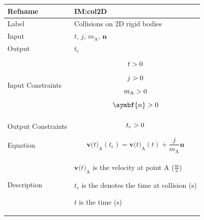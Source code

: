 \documentclass[12pt]{article}
\newcommand{\gt}{\ensuremath >}
\begin{document}
\begin{minipage}{\textwidth}
\begin{tabular}{>{\raggedright}p{}>{\raggedright\arraybackslash}p{}}
\toprule \textbf{Refname} & \textbf{IM:col2D}
\label{IM:col2D}
\\ \midrule
Label & Collisions on 2D rigid bodies
        
\\ \midrule
Input & $t$, $j$, ${m_{\text{A}}}$, $\symbf{n}$
        
\\ \midrule
Output & ${t_{\text{c}}}$
         
\\ \midrule
Input Constraints & \begin{displaymath}
                    t\gt{}0
                    \end{displaymath}
                    \begin{displaymath}
                    j\gt{}0
                    \end{displaymath}
                    \begin{displaymath}
                    {m_{\text{A}}}\gt{}0
                    \end{displaymath}
                    \begin{displaymath}
                    \symbf{n}\gt{}0
                    \end{displaymath}
\\ \midrule
Output Constraints & \begin{displaymath}
                     {t_{\text{c}}}\gt{}0
                     \end{displaymath}
\\ \midrule
Equation & \begin{displaymath}
           {\symbf{v}\text{(}t\text{)}_{\text{A}}}\left({t_{\text{c}}}\right)={\symbf{v}\text{(}t\text{)}_{\text{A}}}\left(t\right)+\frac{j}{{m_{\text{A}}}} \symbf{n}
           \end{displaymath}
\\ \midrule
Description & \begin{symbDescription}
              \item{${\symbf{v}\text{(}t\text{)}_{\text{A}}}$ is the velocity at point A ($\frac{\text{m}}{\text{s}}$)}
              \item{${t_{\text{c}}}$ is the denotes the time at collision (${\text{s}}$)}
              \item{$t$ is the time (${\text{s}}$)}

\end{symbDescription}
\end{tabular}
\end{minipage}
\end{document}
